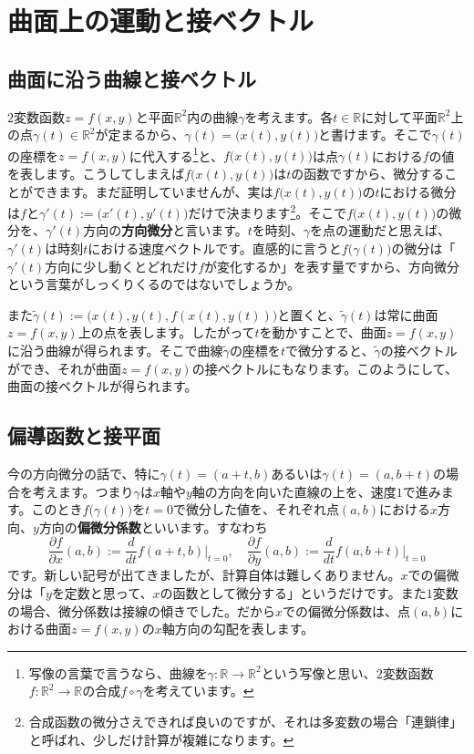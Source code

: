 \section{曲面上の運動と接ベクトル}

\subsection{曲面に沿う曲線と接ベクトル}

$2$変数函数$z=f(x,y)$と平面$\mathbb{R}^2$内の曲線$\gamma$を考えます。各$t\in\mathbb{R}$に対して平面$\mathbb{R}^2$上の点$\gamma(t)\in\mathbb{R}^2$が定まるから、$\gamma(t) = \bigl(x(t), y(t)\bigr)$と書けます。そこで$\gamma(t)$の座標を$z = f(x, y)$に代入する\footnote{写像の言葉で言うなら、曲線を$\gamma\colon\mathbb{R}\rightarrow\mathbb{R}^2$という写像と思い、$2$変数函数$f\colon\mathbb{R}^2\rightarrow\mathbb{R}$の合成$f\circ\gamma$を考えています。}と、$f\bigl(x(t), y(t)\bigr)$は点$\gamma(t)$における$f$の値を表します。こうしてしまえば$f\bigl(x(t), y(t)\bigr)$は$t$の函数ですから、微分することができます。まだ証明していませんが、実は$f\bigl(x(t), y(t)\bigr)$の$t$における微分は$f$と$\gamma'(t) := \bigl(x'(t), y'(t)\bigr)$だけで決まります\footnote{合成函数の微分さえできれば良いのですが、それは多変数の場合「連鎖律」と呼ばれ、少しだけ計算が複雑になります。}。そこで$f\bigl(x(t), y(t)\bigr)$の微分を、$\gamma'(t)$方向の\textbf{方向微分}と言います。$t$を時刻、$\gamma$を点の運動だと思えば、$\gamma'(t)$は時刻$t$における速度ベクトルです。直感的に言うと$f\bigl(\gamma(t)\bigr)$の微分は「$\gamma'(t)$方向に少し動くとどれだけ$f$が変化するか」を表す量ですから、方向微分という言葉がしっくりくるのではないでしょうか。

また$\tilde{\gamma}(t):=\bigl(x(t), y(t), f(x(t), y(t))\bigr)$と置くと、$\tilde{\gamma}(t)$は常に曲面$z = f(x,y)$上の点を表します。したがって$t$を動かすことで、曲面$z = f(x, y)$に沿う曲線が得られます。そこで曲線$\tilde{\gamma}$の座標を$t$で微分すると、$\tilde{\gamma}$の接ベクトルができ、それが曲面$z = f(x, y)$の接ベクトルにもなります。このようにして、曲面の接ベクトルが得られます。

\subsection{偏導函数と接平面}

今の方向微分の話で、特に$\gamma(t) = (a+t, b)$あるいは$\gamma(t) = (a, b+t)$の場合を考えます。つまり$\gamma$は$x$軸や$y$軸の方向を向いた直線の上を、速度$1$で進みます。このとき$f\bigl(\gamma(t)\bigr)$を$t=0$で微分した値を、それぞれ点$(a, b)$における$x$方向、$y$方向の\textbf{偏微分係数}といいます。すなわち
\[
\frac{\partial f}{\partial x}(a, b) := \frac{d}{dt}f(a+t, b)\Bigr|_{t=0}, \quad \frac{\partial f}{\partial y}(a, b) := \frac{d}{dt}f(a, b+t)\Bigr|_{t=0}
\]
です。新しい記号が出てきましたが、計算自体は難しくありません。$x$での偏微分は「$y$を定数と思って、$x$の函数として微分する」というだけです。また$1$変数の場合、微分係数は接線の傾きでした。だから$x$での偏微分係数は、点$(a,b)$における曲面$z = f(x, y)$の$x$軸方向の勾配を表します。

